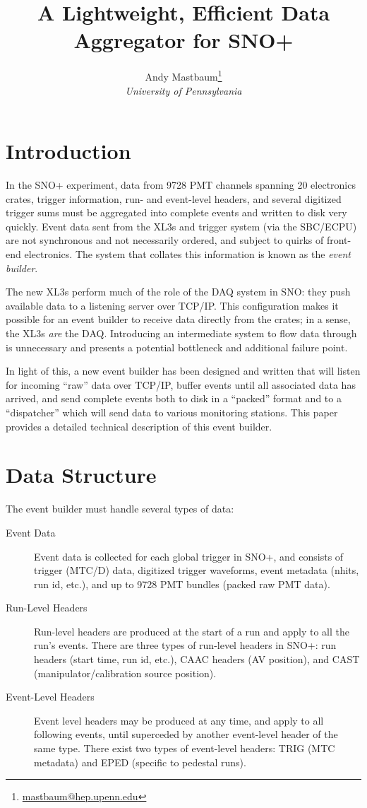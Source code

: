 \documentclass[11pt,twocolumn]{article}
\author{Andy Mastbaum\footnote{\href{mailto:mastbaum@hep.upenn.edu}{mastbaum@hep.upenn.edu}}\\\small{\it University of Pennsylvania}}
\title{A Lightweight, Efficient Data Aggregator for SNO+}
\begin{document}
\maketitle
\section{Introduction}
In the SNO+ experiment, data from 9728 PMT channels spanning 20 electronics crates, trigger information, run- and event-level headers, and several digitized trigger sums must be aggregated into complete events and written to disk very quickly. Event data sent from the XL3s and trigger system (via the SBC/ECPU) are not synchronous and not necessarily ordered, and subject to quirks of front-end electronics. The system that collates this information is known as the {\it event builder}.

The new XL3s perform much of the role of the DAQ system in SNO: they push available data to a listening server over TCP/IP. This configuration makes it possible for an event builder to receive data directly from the crates; in a sense, the XL3s {\it are} the DAQ. Introducing an intermediate system to flow data through is unnecessary and presents a potential bottleneck and additional failure point.

In light of this, a new event builder has been designed and written that will listen for incoming ``raw'' data over TCP/IP, buffer events until all associated data has arrived, and send complete events both to disk in a ``packed'' format and to a ``dispatcher'' which will send data to various monitoring stations. This paper provides a detailed technical description of this event builder.

\section{Data Structure}
The event builder must handle several types of data:
\begin{description}
\item[Event Data] Event data is collected for each global trigger in SNO+, and consists of trigger (MTC/D) data, digitized trigger waveforms, event metadata (nhits, run id, etc.), and up to 9728 PMT bundles (packed raw PMT data).
\item[Run-Level Headers] Run-level headers are produced at the start of a run and apply to all the run's events. There are three types of run-level headers in SNO+: run headers (start time, run id, etc.), CAAC headers (AV position), and CAST (manipulator/calibration source position).
\item[Event-Level Headers] Event level headers may be produced at any time, and apply to all following events, until superceded by another event-level header of the same type. There exist two types of event-level headers: TRIG (MTC metadata) and EPED (specific to pedestal runs).
\end{description}
\end{document}
